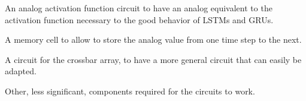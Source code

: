 An analog activation function circuit to have an analog equivalent to the activation function necessary to the good behavior of \acp{LSTM} and \acp{GRU}.

A memory cell to allow to store the analog value from one time step to the next.

A circuit for the crossbar array, to have a more general circuit that can easily be adapted.

Other, less significant, components required for the circuits to work.













\cleardoublepage
